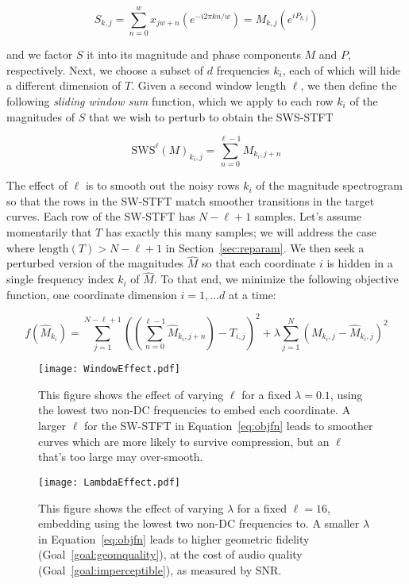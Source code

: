 \documentclass[runningheads]{llncs}
\begin{document}
\begin{equation}
  S_{k, j} = \sum_{n = 0}^w x_{jw + n} \left(e^{-i 2 \pi k n / w} \right) = M_{k, j} \left( e^{i P_{k, j}} \right)
\end{equation}

and we factor $S$ it into its magnitude and phase components $M$ and $P$, respectively.  Next, we choose a subset of $d$ frequencies $k_i$, each of which will hide a different dimension of $T$.  Given a second window length $\ell$, we then define the following {\em sliding window sum} function, which we apply to each row $k_i$ of the magnitudes of $S$ that we wish to perturb to obtain the SWS-STFT

\begin{equation}
  \text{SWS}^{\ell}(M)_{k_i, j} = \sum_{n = 0}^{\ell-1} M_{k_i, j+n}
\end{equation}

The effect of $\ell$ is to smooth out the noisy rows $k_i$ of the magnitude spectrogram so that the rows in the SW-STFT match smoother transitions in the target curves.  Each row of the SW-STFT has $N-\ell+1$ samples.  Let's assume momentarily that $T$ has exactly this many samples; we will address the case where $\text{length}(T) > N-\ell+1$ in Section~\ref{sec:reparam}.  We then seek a perturbed version of the magnitudes $\hat{M}$ so that each coordinate $i$ is hidden in a single frequency index $k_i$ of $\hat{M}$.  To that end, we minimize the following objective function, one coordinate dimension $i = 1, ... d$ at a time:

\begin{equation}
  \label{eq:objfn}
  f(\hat{M}_{k_i}) = \sum_{j=1}^{N-\ell+1} \left( \left( \sum_{n = 0}^{\ell-1} \hat{M}_{k_i, j+n} \right) - T_{i, j} \right)^2 + \lambda \sum_{j=1}^N \left( M_{k_i, j} - \hat{M}_{k_i, j} \right)^2
\end{equation}



\begin{figure}
  \centering
  \texttt{[image: WindowEffect.pdf]}
  \caption{This figure shows the effect of varying $\ell$ for a fixed $\lambda=0.1$, using the lowest two non-DC frequencies to embed each coordinate.  A larger $\ell$ for the SW-STFT in Equation~\ref{eq:objfn} leads to smoother curves which are more likely to survive compression, but an $\ell$ that's too large may over-smooth.}
  \label{fig:WindowEffect}
\end{figure}

\begin{figure}
  \centering
  \texttt{[image: LambdaEffect.pdf]}
  \caption{This figure shows the effect of varying $\lambda$ for a fixed $\ell=16$, embedding using the lowest two non-DC frequencies to.  A smaller $\lambda$ in Equation~\ref{eq:objfn} leads to higher geometric fidelity (Goal~\ref{goal:geomquality}), at the cost of audio quality (Goal~\ref{goal:imperceptible}), as measured by SNR.}
  \label{fig:LambdaEffect}
\end{figure}
\end{document}
